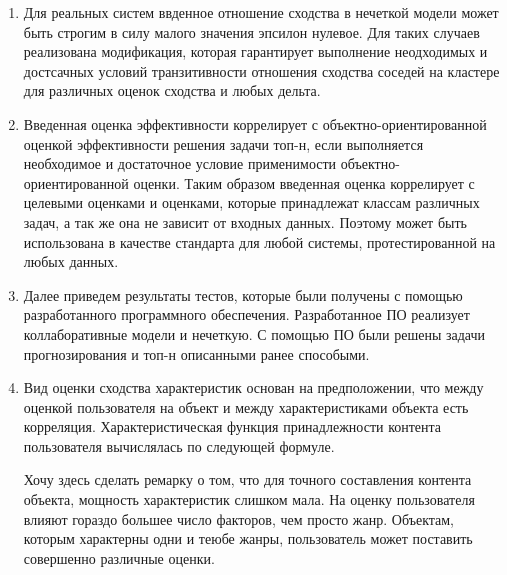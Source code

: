 \documentclass[a4paper,14pt]{proc}
\begin{document}
{\begin{enumerate}
\item Для реальных систем ввденное отношение сходства в нечеткой модели может быть строгим в силу малого значения
эпсилон нулевое. Для таких случаев 
реализована модификация, которая гарантирует выполнение неодходимых и достсачных условий транзитивности отношения 
сходства соседей на кластере для различных оценок сходства и любых дельта.

\item Введенная оценка эффективности коррелирует с объектно-ориентированной оценкой эффективности решения задачи топ-н, если
выполняется необходимое и достаточное условие применимости объектно-ориентированной оценки. Таким образом введенная оценка
коррелирует с целевыми оценками и оценками, которые принадлежат классам различных задач, а так же она не зависит от входных
данных. Поэтому может быть использована в качестве стандарта для любой системы, протестированной на любых данных.

\item Далее приведем результаты тестов, которые были получены с помощью разработанного программного обеспечения.
Разработанное ПО реализует коллаборативные модели и нечеткую. С помощью ПО были решены задачи прогнозирования и топ-н
описанными ранее способыми. 
\item Вид оценки сходства характеристик основан на предположении, что между оценкой пользователя на объект и между
характеристиками объекта есть корреляция. Характеристическая функция принадлежности контента пользователя  вычислялась по следующей формуле.

Хочу здесь сделать ремарку о том, что для точного составления контента объекта, мощность характеристик слишком мала. На оценку пользователя
влияют гораздо большее число факторов, чем просто жанр. Объектам, которым характерны одни и теюбе жанры, пользователь может поставить 
совершенно различные оценки.


\end{enumerate}}
\end{document}
